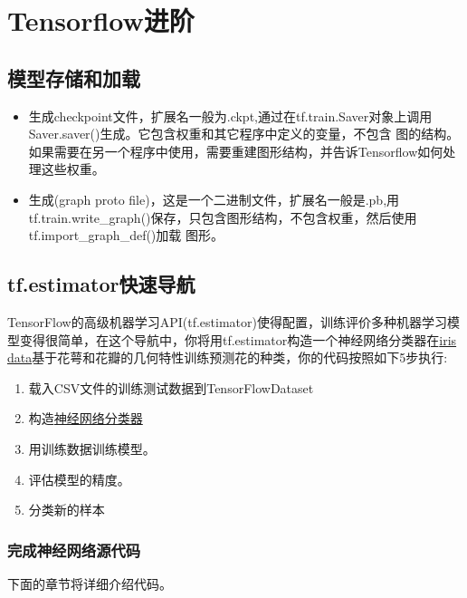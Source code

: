 \chapter{Tensorflow进阶}
\section{模型存储和加载}
\begin{itemize}
\item 生成checkpoint文件，扩展名一般为.ckpt,通过在tf.train.Saver对象上调用Saver.saver()生成。它包含权重和其它程序中定义的变量，不包含
图的结构。如果需要在另一个程序中使用，需要重建图形结构，并告诉Tensorflow如何处理这些权重。
\item 生成(graph proto file)，这是一个二进制文件，扩展名一般是.pb,用tf.train.write\_graph()保存，只包含图形结构，不包含权重，然后使用tf.import\_graph\_def()加载
图形。
\end{itemize}
\section{tf.estimator快速导航}
TensorFlow的高级机器学习API(tf.estimator)使得配置，训练评价多种机器学习模型变得很简单，在这个导航中，你将用tf.estimator构造一个神经网络分类器在\href{https://en.wikipedia.org/wiki/Iris_flower_data_set}{iris data}基于花萼和花瓣的几何特性训练预测花的种类，你的代码按照如下5步执行:
\begin{enumerate}
    \item 载入CSV文件的训练测试数据到TensorFlowDataset
    \item 构造\href{https://www.tensorflow.org/api_docs/python/tf/estimator/DNNClassifier}{神经网络分类器}
    \item 用训练数据训练模型。
    \item 评估模型的精度。
    \item 分类新的样本
\end{enumerate}
\subsection{完成神经网络源代码}

下面的章节将详细介绍代码。

